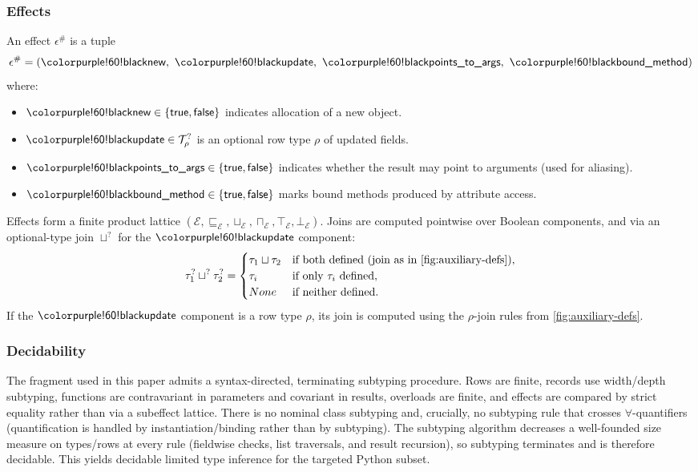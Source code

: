 \subsubsection*{Effects}
\label{sec:effects}
An effect $\epsilon^\#$ is a tuple
\[
\epsilon^\# = (\tnew,\ \tupdate,\ \tptstoargs,\ \tboundmeth)
\]
where:
\begin{itemize}
  \item $\tnew \in \{\mathsf{true},\mathsf{false}\}$ indicates allocation of a new object.
  \item $\tupdate \in \mathcal{T}^?_{\rho}$ is an optional row type $\rho$ of updated fields.
  \item $\tptstoargs \in \{\mathsf{true},\mathsf{false}\}$ indicates whether the result may point to arguments (used for aliasing).
  \item $\tboundmeth \in \{\mathsf{true},\mathsf{false}\}$ marks bound methods produced by attribute access.
\end{itemize}

Effects form a finite product lattice $(\mathcal{E}, \sqsubseteq_{\mathcal{E}}, \sqcup_{\mathcal{E}}, \sqcap_{\mathcal{E}}, \top_{\mathcal{E}}, \bot_{\mathcal{E}})$.  
Joins are computed pointwise over Boolean components, and via an optional-type join $\sqcup^?$ for the $\tupdate$ component:
\[
\tau_1^? \sqcup^? \tau_2^? =
\begin{cases}
\tau_1 \sqcup \tau_2 & \text{if both defined (join as in \cref{fig:auxiliary-defs})},\\
\tau_i & \text{if only $\tau_i$ defined},\\
None & \text{if neither defined}.
\end{cases}
\]
If the $\tupdate$ component is a row type $\rho$, its join is computed using the $\rho$-join rules from \cref{fig:auxiliary-defs}.

\subsubsection*{Decidability}
The fragment used in this paper admits a syntax-directed, terminating subtyping procedure. Rows are finite, records use width/depth subtyping, functions are contravariant in parameters and covariant in results, overloads are finite, and effects are compared by strict equality rather than via a subeffect lattice. There is no nominal class subtyping and, crucially, no subtyping rule that crosses $\forall$-quantifiers (quantification is handled by instantiation/binding rather than by subtyping). The subtyping algorithm decreases a well-founded size measure on types/rows at every rule (fieldwise checks, list traversals, and result recursion), so subtyping terminates and is therefore decidable. This yields decidable limited type inference for the targeted Python subset. 

